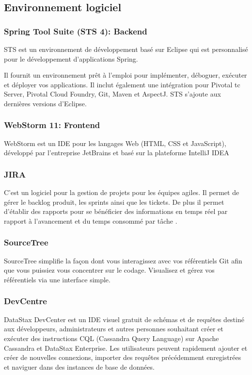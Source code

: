     \subsection{Environnement logiciel}
    
    \subsubsection{Spring Tool Suite (STS 4): Backend}
    
   STS est un environnement de développement basé sur Eclipse qui est personnalisé pour le développement d'applications Spring.

Il fournit un environnement prêt à l'emploi pour implémenter, déboguer, exécuter et déployer vos applications. Il inclut également une intégration pour Pivotal tc Server, Pivotal Cloud Foundry, Git, Maven et AspectJ. STS s’ajoute aux dernières versions d’Eclipse.
    
    \subsubsection{WebStorm 11: Frontend}
    WebStorm est un IDE pour les langages Web (HTML, CSS et JavaScript), développé par l'entreprise JetBrains et basé sur la plateforme IntelliJ IDEA
    

    
    \subsubsection{JIRA}
    
    C’est un logiciel pour la gestion de projets pour les équipes agiles. Il permet de gérer le backlog produit, les sprints ainsi que les tickets. De plus il permet d’établir des rapports pour se bénéficier des informations en temps réel par rapport à l’avancement et du temps consommé par tâche .
    
    \subsubsection{SourceTree}
    SourceTree simplifie la façon dont vous interagissez avec vos référentiels Git afin que vous puissiez vous concentrer sur le codage. Visualisez et gérez vos référentiels via une interface simple.
    
    \subsubsection{DevCentre}
    DataStax DevCenter est un IDE visuel gratuit de schémas et de requêtes destiné aux développeurs, administrateurs et autres personnes souhaitant créer et exécuter des instructions CQL (Cassandra Query Language) sur Apache Cassandra et DataStax Enterprise. Les utilisateurs peuvent rapidement ajouter et créer de nouvelles connexions, importer des requêtes précédemment enregistrées et naviguer dans des instances de base de données. 
    
